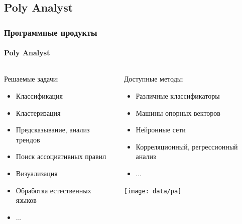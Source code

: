 \documentclass[xcolor=table]{beamer}
\begin{document}
\subsection{Poly Analyst}
\begin{frame}
  \frametitle{Программные продукты}
  \framesubtitle{Poly Analyst}
  \begin{columns}[t]
    \begin{column}{0.5\textwidth}
      Решаемые задачи:
      \begin{center}
        \begin{itemize}
          \item Классификация
          \item Кластеризация
          \item Предсказывание, анализ трендов
          \item Поиск ассоциативных правил
          \item Визуализация
          \item Обработка естественных языков
          \item ...
        \end{itemize}
      \end{center}
    \end{column}
    
    \begin{column}{0.5\textwidth}
      Доступные методы:
      \begin{center}
        \begin{itemize}
          \item Различные классификаторы
          \item Машины опорных векторов
          \item Нейронные сети
          \item Корреляционный, регрессионный анализ
          \item ...
        \end{itemize}
      \end{center}

      \texttt{[image: data/pa]}
    \end{column}
    
  \end{columns}
\end{frame}
\end{document}
